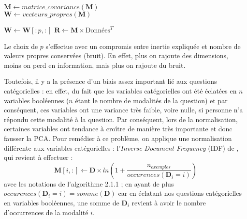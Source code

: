 \documentclass[11pt,fleqn,openany,frenchb]{book} %
\begin{document}
\begin{definition}
\begin{algorithm}[H]
 \BlankLine
 \BlankLine
 $\mathbf{M}\leftarrow matrice\_covariance(\mathbf{M})$\\
 $\mathbf{W}\leftarrow vecteurs\_propres(\mathbf{M})$\\
 \BlankLine

 $\mathbf{W}\leftarrow \mathbf{W}[:p,:]$  
 $\mathbf{R}\leftarrow \mathbf{M} \times\textrm{Données}^T$\\
\label{alg:ACP}
\end{algorithm}

\end{definition}

Le choix de $p$ s'effectue avec un compromis entre inertie expliquée et nombre de valeurs propres conservées (bruit). En effet, plus on rajoute des dimensions, moins on perd en information, mais plus on rajoute du bruit.\par

Toutefois, il y a la présence d'un biais assez important lié aux questions catégorielles : en effet, du fait que les variables catégorielles ont été éclatées en $n$ variables booléennes ($n$ étant le nombre de modalités de la question) et par conséquent, ces variables ont une variance très faible, voire nulle, si personne n'a répondu cette modalité à la question. Par conséquent, lors de la normalisation, certaines variables ont tendance à croître de manière très importante et donc fausser la PCA. Pour remédier à ce problème, on applique une normalisation différente aux variables catégorielles : l'\textit{Inverse Document Frequency} (IDF) de \cite{sparckjones1972}, qui revient à effectuer : 
$$\mathbf{M}[i,:]\leftarrow \mathbf{D} \times ln \left(1+\frac{n_{exemples}}{occurences(\mathbf{D}_i=i)}\right)  $$
avec les notations de l'algorithme 2.1.1 ; en ayant de plus $occurences(\mathbf{D}_i=i)=somme(\mathbf{D})$ car en éclatant nos questions catégorielles en variables booléennes, une somme de $\mathbf{D}_i$ revient à avoir le nombre d'occurrences de la modalité $i$.
\end{document}
